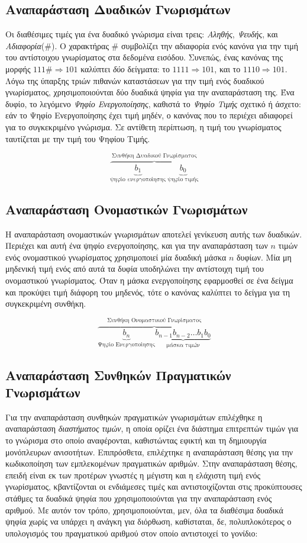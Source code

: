 \subsection{Αναπαράσταση Δυαδικών Γνωρισμάτων}
Οι διαθέσιμες τιμές για ένα δυαδικό γνώρισμα είναι τρεις: \emph{Αληθής}, \emph{Ψευδής}, και \emph{Αδιαφορία}(\#). Ο χαρακτήρας \# συμβολίζει την αδιαφορία ενός κανόνα για την τιμή του αντίστοιχου γνωρίσματος στα δεδομένα εισόδου. Συνεπώς, ένας κανόνας της μορφής $111\# \Rightarrow 101$ καλύπτει \emph{δύο} δείγματα: το $1111 \Rightarrow 101$, και το $1110 \Rightarrow 101$. Λόγω της ύπαρξης τριών πιθανών καταστάσεων για την τιμή ενός δυαδικού γνωρίσματος, χρησιμοποιούνται δύο δυαδικά ψηφία για την αναπαράσταση της. Ένα δυφίο, το λεγόμενο \emph{Ψηφίο Ενεργοποίησης}, καθιστά το \emph{Ψηφίο Τιμής} σχετικό ή άσχετο: εάν το Ψηφίο Ενεργοποίησης έχει τιμή μηδέν, ο κανόνας που το περιέχει αδιαφορεί για το συγκεκριμένο γνώρισμα. Σε αντίθετη περίπτωση, η τιμή του γνωρίσματος ταυτίζεται με την τιμή  του Ψηφίου Τιμής.

$$ \overbrace{
\underbrace{b_{1}}_\text{ψηφίο ενεργοποίησης} \:
\underbrace{b_{0}}_\text{ψηφίο τιμής}}
^\text{Συνθήκη Δυαδικού Γνωρίσματος}$$

\subsection{Αναπαράσταση Ονομαστικών Γνωρισμάτων}
Η αναπαράσταση ονομαστικών γνωρισμάτων αποτελεί γενίκευση αυτής των δυαδικών. Περιέχει και αυτή ένα ψηφίο ενεργοποίησης, και για την αναπαράσταση των $n$ τιμών ενός ονομαστικού γνωρίσματος χρησιμοποιεί μία δυαδική μάσκα $n$ δυφίων. Μία μη μηδενική τιμή ενός από αυτά τα δυφία υποδηλώνει την αντίστοιχη τιμή του ονομαστικού γνωρίσματος. Όταν η μάσκα ενεργοποίησης εφαρμοσθεί σε ένα δείγμα και προκύψει τιμή διάφορη του μηδενός, τότε ο κανόνας καλύπτει το δείγμα για τη συγκεκριμένη συνθήκη.

$$ \overbrace{
\underbrace{b_{n}}_\text{Ψηφίο Ενεργοποίησης}
\underbrace{b_{n-1}b_{n-2}
\dots b_{1}b_{0}}_\text{μάσκα τιμών}
}^\text{Συνθήκη Ονομαστικού Γνωρίσματος}$$

\subsection{Αναπαράσταση Συνθηκών Πραγματικών Γνωρισμάτων}
Για την αναπαράσταση συνθηκών πραγματικών γνωρισμάτων επιλέχθηκε η αναπαράσταση \emph{διαστήματος τιμών}, η οποία ορίζει ένα διάστημα επιτρεπτών τιμών για το γνώρισμα στο οποίο αναφέρονται, καθιστώντας εφικτή και τη δημιουργία μονόπλευρων ανισοτήτων. Επιπρόσθετα, επιλέχτηκε η αναπαράσταση θέσης για την κωδικοποίηση των εμπλεκομένων πραγματικών αριθμών. Στην αναπαράσταση θέσης, επειδή είναι εκ των προτέρων γνωστές η μέγιστη και η ελάχιστη τιμή ενός γνωρίσματος, κβαντίζονται οι ενδιάμεσες τιμές και αντιστοιχίζονται στις προκύπτουσες στάθμες τα δυαδικά ψηφία που χρησιμοποιούνται για την αναπαράσταση ενός αριθμού. Με αυτόν τον τρόπο, χρησιμοποιούνται, μεν, όλα τα διαθέσιμα δυαδικά ψηφία χωρίς να υπάρχει η ανάγκη για διόρθωση, καθίσταται, δε, πολυπλοκότερος ο υπολογισμός του πραγματικού αριθμού στον οποίο αντιστοιχεί το γονίδιο:
\\

